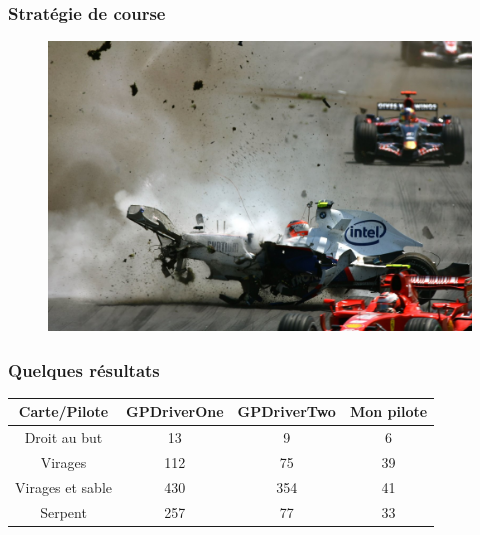 \documentclass[c]{beamer}
\begin{document}
\begin{frame}[label=strategie7]
\frametitle{Stratégie de course}
\begin{figure}[!h]
\centering
\includegraphics[scale=0.18]{fig/crash.jpg}
\end{figure}
\end{frame}

\begin{frame}[label=resultats]
\transdissolve[duration=1]
\frametitle{Quelques résultats}
\begin{tabular}{|c|c|c|c|}
  \hline
  Carte/Pilote& GPDriverOne & GPDriverTwo & Mon pilote \\
  \hline
  Droit au but &13 & 9 & 6 \\
  Virages &112 & 75 & 39 \\
  Virages et sable & 430 & 354& 41\\
  Serpent & 257 & 77& 33\\
  \hline
\end{tabular}
\end{frame}
\end{document}
